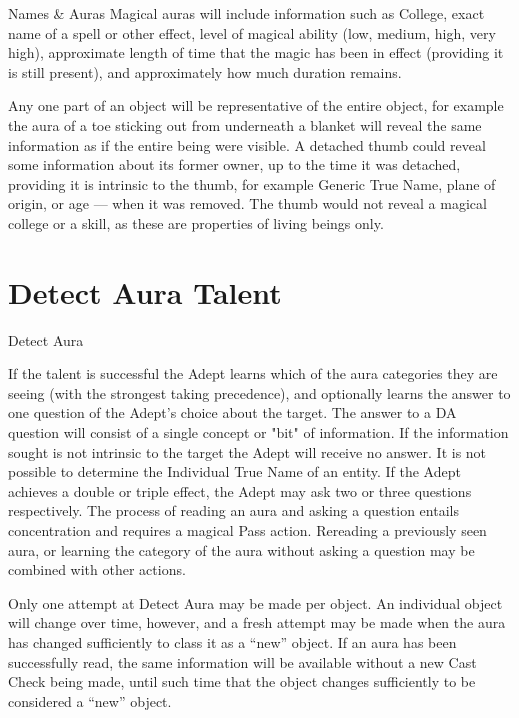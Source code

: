 \begin{Chapter}{Names \& Auras}
Magical auras will include information such as College, exact name of
a spell or other effect, level of magical ability (low, medium, high,
very high), approximate length of time that the magic has been in
effect (providing it is still present), and approximately how much
duration remains.

Any one part of an object will be representative of the entire object,
for example the aura of a toe sticking out from underneath a blanket
will reveal the same information as if the entire being were visible.
A detached thumb could reveal some information about its former
owner, up to the time it was detached, providing it is intrinsic to
the thumb, for example Generic True Name, plane of origin, or age —
when it was removed. The thumb would not reveal a magical college or a
skill, as these are properties of living beings only.

\section{Detect Aura Talent}
\label{talent:detectaura}
\begin{talent}{Detect Aura}
\begin{effects}
If the talent is successful the Adept learns which of the aura
categories they are seeing (with the strongest taking precedence), and
optionally learns the answer to one question of the Adept’s choice
about the target. The answer to a DA question will consist of a single
concept or "bit" of information. If the information sought is not
intrinsic to the target the Adept will receive no answer.  It is not
possible to determine the Individual True Name of an entity.  If the
Adept achieves a double or triple effect, the Adept may ask two or
three questions respectively.  The process of reading an aura and
asking a question entails concentration and requires a magical Pass
action.  Rereading a previously seen aura, or learning the category of
the aura without asking a question may be combined with other actions.

Only one attempt at Detect Aura may be made per object. An individual
object will change over time, however, and a fresh attempt may be made
when the aura has changed sufficiently to class it as a “new”
object. If an aura has been successfully read, the same information
will be available without a new Cast Check being made, until such time
that the object changes sufficiently to be considered a “new” object.


\end{effects}
\end{talent}
\end{Chapter}

